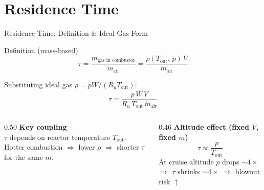 \documentclass[12pt,aspectratio=169]{beamer}
\newcommand{\taures}{\tau}
\newcommand{\Vr}{V}
\newcommand{\Tout}{T_{\text{out}}}
\newcommand{\mdot}{\dot{m}}
\begin{document}
\section{Residence Time}

\begin{frame}{Residence Time: Definition \& Ideal-Gas Form}

  \begin{block}{Definition (mass-based)}
    \[
      \taures = \frac{m_{\text{gas in combustor}}}{\mdot_{\text{air}}}
      = \frac{\rho(\Tout,\,p)\,\Vr}{\mdot_{\text{air}}}
    \]
  \end{block}

  Substituting ideal gas $\rho = p\bar{W}/(R_u \Tout)$:
  \[
    \boxed{
      \taures = \frac{p\,\bar{W}\,\Vr}{R_u\,\Tout\,\mdot_{\text{air}}}
    }
  \]

  \begin{columns}[t]
    \begin{column}{0.50\textwidth}
      \textbf{Key coupling}\\[4pt]
      $\taures$ depends on \alert{reactor temperature $\Tout$}.
      Hotter combustion $\Rightarrow$ lower $\rho$ $\Rightarrow$
      shorter $\taures$ for the same $\mdot$.
    \end{column}
    \begin{column}{0.46\textwidth}
      \textbf{Altitude effect (fixed $\Vr$, fixed $\mdot$)}\\[4pt]
      \[
        \taures \propto \frac{p}{\Tout}
      \]
      At cruise altitude $p$ drops $\sim 4\times$
      $\Rightarrow$ $\taures$ shrinks $\sim 4\times$
      $\Rightarrow$ blowout risk $\uparrow$
    \end{column}
  \end{columns}
\end{frame}
\end{document}
